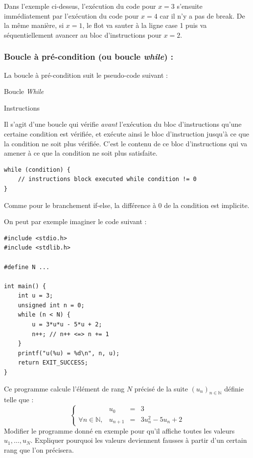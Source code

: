 \documentclass[../../../main.tex]{subfiles}
\begin{document}
Dans l'exemple ci-dessus, l'exécution du code pour $x = 3$ s'ensuite immédiatement par l'exécution du code pour $x = 4$ car il n'y a pas de \textsf{break}. De la même manière, si $x = 1$, le flot va sauter à la ligne \textsf{case 1} puis va séquentiellement avancer au bloc d'instructions pour $x = 2$.
\subsubsection{Boucle à pré-condition (ou boucle \textit{while}) :}
La boucle à pré-condition suit le pseudo-code suivant :
\begin{algorithm}
\caption{Boucle \textit{While}}
 {
	Instructions
}
\end{algorithm}
\newline
Il s'agit d'une boucle qui vérifie \textit{avant} l'exécution du bloc d'instructions qu'une certaine condition est vérifiée, et exécute ainsi le bloc d'instruction jusqu'à ce que la condition ne soit plus vérifiée. C'est le contenu de ce bloc d'instructions qui va amener à ce que la condition ne soit plus satisfaite.
\begin{verbatim}
while (condition) {
	// instructions block executed while condition != 0
}
\end{verbatim}
Comme pour le branchement \textsf{if-else}, la différence à 0 de la condition est implicite.
 
On peut par exemple imaginer le code suivant :
\begin{verbatim}
#include <stdio.h>
#include <stdlib.h>

#define N ...

int main() {
	int u = 3;
	unsigned int n = 0;
	while (n < N) {
		u = 3*u*u - 5*u + 2;
		n++; // n++ <=> n += 1
	}
	printf("u(%u) = %d\n", n, u);
	return EXIT_SUCCESS;
}
\end{verbatim}
Ce programme calcule l'élément de rang $N$ précisé de la suite $(u_{n})_{n\in{\mathbb{N}}}$ définie telle que :
$$
\left\{\begin{array}{llcl}
& u_{0} & = & 3 \\
\forall{n\in{\mathbb{N}}}, & u_{n+1} & = & 3u_{n}^{2} - 5u_{n} + 2
\end{array}\right.
$$
\exercise{[COURS]} Modifier le programme donné en exemple pour qu'il affiche toutes les valeurs $u_{1}, \dots, u_{N}$. \newline
Expliquer pourquoi les valeurs deviennent fausses à partir d'un certain rang que l'on précisera.
 
\end{document}
